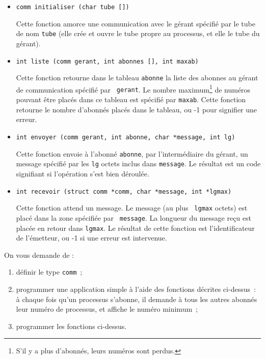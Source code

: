 \documentclass [twoside] {report}
\begin{document}
\begin {itemize}

    \item \verb:comm initialiser (char tube []):

	Cette fonction amorce une communication avec le gérant spécifié
	par le tube de nom {\tt tube} (elle crée et ouvre le tube propre
	au processus, et elle le tube du gérant).

    \item \verb:int liste (comm gerant, int abonnes [], int maxab):

	Cette fonction retourne dans le tableau {\tt abonne} la liste
	des abonnes au gérant de communication spécifié par {\tt
	gerant}.  Le nombre maximum\footnote {S'il y a plus d'abonnés,
	leurs numéros sont perdus.} de numéros pouvant être placés dans
	ce tableau est spécifié par {\tt maxab}. Cette fonction retourne
	le nombre d'abonnés placés dans le tableau, ou -1 pour signifier
	une erreur.
    
    \item \verb:int envoyer (comm gerant, int abonne, char *message, int lg):

	Cette fonction envoie à l'abonné {\tt abonne}, par
	l'intermédiaire du gérant, un message spécifié par les {\tt lg}
	octets inclus dans {\tt message}.  Le résultat est un code
	signifiant si l'opération s'est bien déroulée.

    \item \verb:int recevoir (struct comm *comm, char *message, int *lgmax):

	Cette fonction attend un message. Le message (au plus {\tt
	lgmax} octets) est placé dans la zone spécifiée par {\tt
	message}. La longueur du message reçu est placée en retour dans
	{\tt lgmax}. Le résultat de cette fonction est l'identificateur
	de l'émetteur, ou -1 si une erreur est intervenue.

\end {itemize}

On vous demande de :

\begin {enumerate}

    \item définir le type {\tt comm}~;

    \item programmer une application simple à l'aide des fonctions
	décrites ci-dessus~: à chaque fois qu'un processus s'abonne, il
	demande à tous les autres abonnés leur numéro de processus, et
	affiche le numéro minimum~;
    
    \item programmer les fonctions ci-dessus.

\end {enumerate}
\end{document}
